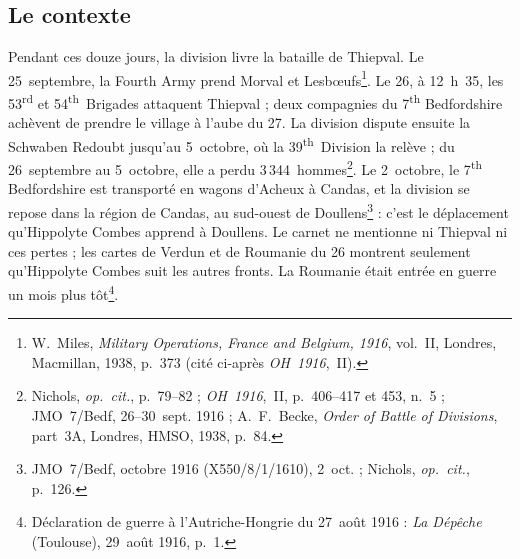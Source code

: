 \subsection*{Le contexte}

Pendant ces douze jours, la division livre la bataille de Thiepval. Le 25~septembre, la Fourth Army prend Morval et Lesbœufs\footnote{W.~Miles, \textit{Military Operations, France and Belgium, 1916}, vol.~II, Londres, Macmillan, 1938, p.~373 (cité ci-après \textit{OH~1916},~II).}. Le 26, à 12~h~35, les 53\textsuperscript{rd} et 54\textsuperscript{th}~Brigades attaquent Thiepval ; deux compagnies du 7\textsuperscript{th} Bedfordshire achèvent de prendre le village à l'aube du 27. La division dispute ensuite la Schwaben Redoubt jusqu'au 5~octobre, où la 39\textsuperscript{th}~Division la relève ; du 26~septembre au 5~octobre, elle a perdu 3\,344~hommes\footnote{Nichols, \textit{op.~cit.}, p.~79--82 ; \textit{OH~1916},~II, p.~406--417 et 453, n.~5 ; JMO~7/Bedf, 26--30~sept. 1916 ; A.~F.~Becke, \textit{Order of Battle of Divisions}, part~3A, Londres, HMSO, 1938, p.~84.}. Le 2~octobre, le 7\textsuperscript{th} Bedfordshire est transporté en wagons d'Acheux à Candas, et la division se repose dans la région de Candas, au sud-ouest de Doullens\footnote{JMO~7/Bedf, octobre 1916 (X550/8/1/1610), 2~oct. ; Nichols, \textit{op.~cit.}, p.~126.} : c'est le déplacement qu'Hippolyte Combes apprend à Doullens. Le carnet ne mentionne ni Thiepval ni ces pertes ; les cartes de Verdun et de Roumanie du 26 montrent seulement qu'Hippolyte Combes suit les autres fronts. La Roumanie était entrée en guerre un mois plus tôt\footnote{Déclaration de guerre à l'Autriche-Hongrie du 27~août 1916 : \textit{La Dépêche} (Toulouse), 29~août 1916, p.~1.}.

